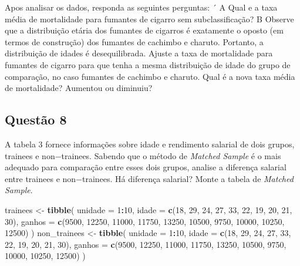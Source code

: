 \documentclass[
]{article}
\newenvironment{Shaded}{\begin{snugshade}}{\end{snugshade}}
\newcommand{\DataTypeTok}[1]{\textcolor[rgb]{0.13,0.29,0.53}{#1}}
\newcommand{\DecValTok}[1]{\textcolor[rgb]{0.00,0.00,0.81}{#1}}
\newcommand{\KeywordTok}[1]{\textcolor[rgb]{0.13,0.29,0.53}{\textbf{#1}}}
\newcommand{\NormalTok}[1]{#1}
\newcommand{\OperatorTok}[1]{\textcolor[rgb]{0.81,0.36,0.00}{\textbf{#1}}}
\newcommand{\StringTok}[1]{\textcolor[rgb]{0.31,0.60,0.02}{#1}}
\begin{document}
Apos analisar os dados, responda as seguintes perguntas: ´ A Qual e a
taxa média de mortalidade para fumantes de cigarro sem subclassificação?
B Observe que a distribuição etária dos fumantes de cigarros é
exatamente o oposto (em termos de construção) dos fumantes de cachimbo e
charuto. Portanto, a distribuição de idades é desequilibrada. Ajuste a
taxa de mortalidade para fumantes de cigarro para que tenha a mesma
distribuição de idade do grupo de comparação, no caso fumantes de
cachimbo e charuto. Qual é a nova taxa média de mortalidade? Aumentou ou
diminuiu?

\hypertarget{questuxe3o-8}{%
\subsection{Questão 8}\label{questuxe3o-8}}

A tabela 3 fornece informações sobre idade e rendimento salarial de dois
grupos, trainees e non−trainees. Sabendo que o método de \emph{Matched
Sample} é o mais adequado para comparação entre esses dois grupos,
analise a diferença salarial entre trainees e non−trainees. Há diferença
salarial? Monte a tabela de \emph{Matched Sample}.

\begin{Shaded}
\begin{Highlighting}[]
\NormalTok{trainees <-}\StringTok{ }\KeywordTok{tibble}\NormalTok{(}
  \DataTypeTok{unidade =} \DecValTok{1}\OperatorTok{:}\DecValTok{10}\NormalTok{,}
  \DataTypeTok{idade =} \KeywordTok{c}\NormalTok{(}\DecValTok{18}\NormalTok{, }\DecValTok{29}\NormalTok{, }\DecValTok{24}\NormalTok{, }\DecValTok{27}\NormalTok{, }\DecValTok{33}\NormalTok{, }\DecValTok{22}\NormalTok{, }\DecValTok{19}\NormalTok{, }\DecValTok{20}\NormalTok{, }\DecValTok{21}\NormalTok{, }\DecValTok{30}\NormalTok{),}
  \DataTypeTok{ganhos =} \KeywordTok{c}\NormalTok{(}\DecValTok{9500}\NormalTok{, }\DecValTok{12250}\NormalTok{, }\DecValTok{11000}\NormalTok{, }\DecValTok{11750}\NormalTok{, }\DecValTok{13250}\NormalTok{, }\DecValTok{10500}\NormalTok{, }\DecValTok{9750}\NormalTok{, }\DecValTok{10000}\NormalTok{, }\DecValTok{10250}\NormalTok{, }\DecValTok{12500}\NormalTok{)}
\NormalTok{)}
\NormalTok{non_trainees <-}\StringTok{ }\KeywordTok{tibble}\NormalTok{(}
  \DataTypeTok{unidade =} \DecValTok{1}\OperatorTok{:}\DecValTok{10}\NormalTok{,}
  \DataTypeTok{idade =} \KeywordTok{c}\NormalTok{(}\DecValTok{18}\NormalTok{, }\DecValTok{29}\NormalTok{, }\DecValTok{24}\NormalTok{, }\DecValTok{27}\NormalTok{, }\DecValTok{33}\NormalTok{, }\DecValTok{22}\NormalTok{, }\DecValTok{19}\NormalTok{, }\DecValTok{20}\NormalTok{, }\DecValTok{21}\NormalTok{, }\DecValTok{30}\NormalTok{),}
  \DataTypeTok{ganhos =} \KeywordTok{c}\NormalTok{(}\DecValTok{9500}\NormalTok{, }\DecValTok{12250}\NormalTok{, }\DecValTok{11000}\NormalTok{, }\DecValTok{11750}\NormalTok{, }\DecValTok{13250}\NormalTok{, }\DecValTok{10500}\NormalTok{, }\DecValTok{9750}\NormalTok{, }\DecValTok{10000}\NormalTok{, }\DecValTok{10250}\NormalTok{, }\DecValTok{12500}\NormalTok{)}
\NormalTok{)}
\end{Highlighting}
\end{Shaded}
\end{document}
